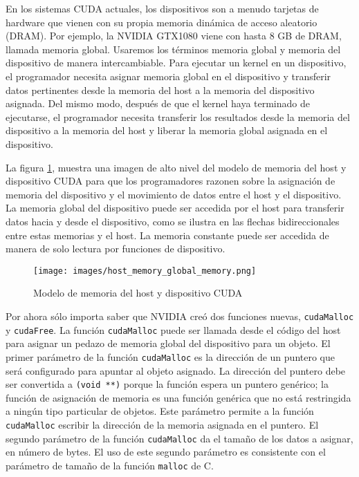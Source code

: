 En los sistemas CUDA actuales, los dispositivos son a menudo tarjetas de hardware que vienen con su propia memoria
dinámica de acceso aleatorio (DRAM). Por ejemplo, la NVIDIA GTX1080 viene con hasta 8 GB de DRAM, llamada memoria
global. Usaremos los términos memoria global y memoria del dispositivo de manera intercambiable. Para ejecutar un kernel
en un dispositivo, el programador necesita asignar memoria global en el dispositivo y transferir datos pertinentes desde
la memoria del host a la memoria del dispositivo asignada. Del mismo modo, después de que el kernel haya terminado de
ejecutarse, el programador necesita transferir los resultados desde la memoria del dispositivo a la memoria del host y
liberar la memoria global asignada en el dispositivo.

La figura \ref{fig:host_memory_global_memory}, muestra una imagen de alto nivel del modelo de memoria del host y
dispositivo CUDA para que los programadores razonen sobre la asignación de memoria del dispositivo y el movimiento de
datos entre el host y el dispositivo. La memoria global del dispositivo puede ser accedida por el host para transferir
datos hacia y desde el dispositivo, como se ilustra en las flechas bidireccionales entre estas memorias y el host. La
memoria constante puede ser accedida de manera de solo lectura por funciones de dispositivo.

\begin{figure}[h]
  \centering
  \texttt{[image: images/host\_memory\_global\_memory.png]}
  \caption{Modelo de memoria del host y dispositivo CUDA}
  \label{fig:host_memory_global_memory}
\end{figure}

Por ahora sólo importa saber que NVIDIA creó dos funciones nuevas, \texttt{cudaMalloc} y \texttt{cudaFree}. La función
\texttt{cudaMalloc} puede ser llamada desde el código del host para asignar un pedazo de memoria global del dispositivo
para un objeto. El primer parámetro de la función \texttt{cudaMalloc} es la dirección de un puntero que será configurado
para apuntar al objeto asignado. La dirección del puntero debe ser convertida a \texttt{(void **)} porque la función
espera un puntero genérico; la función de asignación de memoria es una función genérica que no está restringida a
ningún tipo particular de objetos. Este parámetro permite a la función \texttt{cudaMalloc} escribir la dirección de la
memoria asignada en el puntero. El segundo parámetro de la función \texttt{cudaMalloc} da el tamaño de los datos a
asignar, en número de bytes. El uso de este segundo parámetro es consistente con el parámetro de tamaño de la función
\texttt{malloc} de C.

